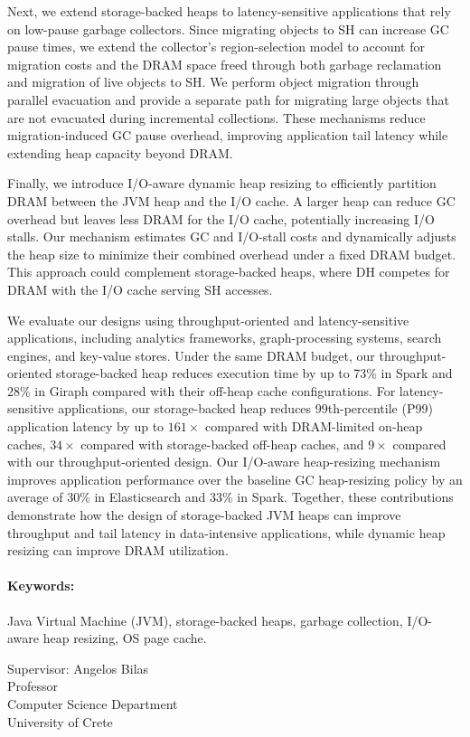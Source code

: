 Next, we extend storage-backed heaps to latency-sensitive applications that rely on low-pause garbage collectors.
Since migrating objects to SH can increase GC pause times, we extend the collector's region-selection model to account for migration costs and the DRAM space freed through both garbage reclamation and migration of live objects to SH.
We perform object migration through parallel evacuation and provide a separate path for migrating large objects that are not evacuated during incremental collections.
These mechanisms reduce migration-induced GC pause overhead, improving application tail latency while extending heap capacity beyond DRAM.

Finally, we introduce I/O-aware dynamic heap resizing to efficiently partition DRAM between the JVM heap and the I/O cache.
A larger heap can reduce GC overhead but leaves less DRAM for the I/O cache, potentially increasing I/O stalls.
Our mechanism estimates GC and I/O-stall costs and dynamically adjusts the heap size to minimize their combined overhead under a fixed DRAM budget.
This approach could complement storage-backed heaps, where DH competes for DRAM with the I/O cache serving SH accesses.

We evaluate our designs using throughput-oriented and latency-sensitive applications, including analytics frameworks, graph-processing systems, search engines, and key-value stores.
Under the same DRAM budget, our throughput-oriented storage-backed heap reduces execution time by up to 73\% in Spark and 28\% in Giraph compared with their off-heap cache configurations.
For latency-sensitive applications, our storage-backed heap reduces 99th-percentile (P99) application latency by up to $161\times$ compared with DRAM-limited on-heap caches, $34\times$ compared with storage-backed off-heap caches, and $9\times$ compared with our throughput-oriented design.
Our I/O-aware heap-resizing mechanism improves application performance over the baseline GC heap-resizing policy by an average of 30\% in Elasticsearch and 33\% in Spark.
Together, these contributions demonstrate how the design of storage-backed JVM heaps can improve throughput and tail latency in data-intensive applications, while dynamic heap resizing can improve DRAM utilization.

\paragraph{Keywords:} Java Virtual Machine (JVM), storage-backed heaps, garbage collection, I/O-aware heap resizing, OS page cache.

\begin{center}
	Supervisor: Angelos Bilas \\ Professor\\ Computer Science Department\\ University of Crete
\end{center}



